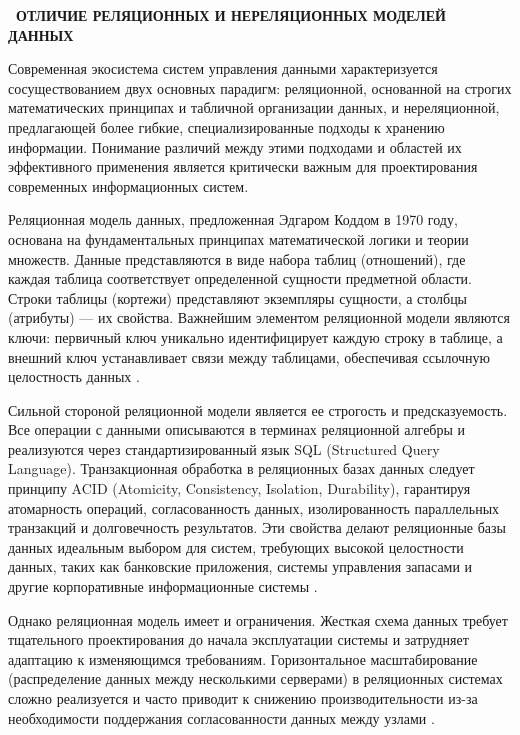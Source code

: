 \documentclass{SibFU-docs}
\begin{document}
\newpage
{}
\begin{center}\textbf{\thesection\ ОТЛИЧИЕ РЕЛЯЦИОННЫХ И НЕРЕЛЯЦИОННЫХ МОДЕЛЕЙ ДАННЫХ}\end{center}
\vspace*{-1.5em}


Современная экосистема систем управления данными характеризуется сосуществованием двух основных парадигм: реляционной, основанной на строгих математических принципах и табличной организации данных, и нереляционной, предлагающей более гибкие, специализированные подходы к хранению информации. Понимание различий между этими подходами и областей их эффективного применения является критически важным для проектирования современных информационных систем.


Реляционная модель данных, предложенная Эдгаром Коддом в 1970 году, основана на фундаментальных принципах математической логики и теории множеств. Данные представляются в виде набора таблиц (отношений), где каждая таблица соответствует определенной сущности предметной области. Строки таблицы (кортежи) представляют экземпляры сущности, а столбцы (атрибуты) — их свойства. Важнейшим элементом реляционной модели являются ключи: первичный ключ уникально идентифицирует каждую строку в таблице, а внешний ключ устанавливает связи между таблицами, обеспечивая ссылочную целостность данных \cite{codd1970}.

Сильной стороной реляционной модели является ее строгость и предсказуемость. Все операции с данными описываются в терминах реляционной алгебры и реализуются через стандартизированный язык SQL (Structured Query Language). Транзакционная обработка в реляционных базах данных следует принципу ACID (Atomicity, Consistency, Isolation, Durability), гарантируя атомарность операций, согласованность данных, изолированность параллельных транзакций и долговечность результатов. Эти свойства делают реляционные базы данных идеальным выбором для систем, требующих высокой целостности данных, таких как банковские приложения, системы управления запасами и другие корпоративные информационные системы \cite{haerder1983}.

Однако реляционная модель имеет и ограничения. Жесткая схема данных требует тщательного проектирования до начала эксплуатации системы и затрудняет адаптацию к изменяющимся требованиям. Горизонтальное масштабирование (распределение данных между несколькими серверами) в реляционных системах сложно реализуется и часто приводит к снижению производительности из-за необходимости поддержания согласованности данных между узлами \cite{sadalage2012}.
\end{document}
